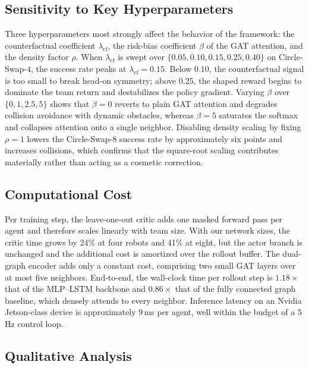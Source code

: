 \documentclass[journal,twoside,web]{ieeecolor}
\begin{document}
\subsection{Sensitivity to Key Hyperparameters}

Three hyperparameters most strongly affect the behavior of the framework: the counterfactual coefficient $\lambda_{\text{cf}}$, the risk-bias coefficient $\beta$ of the GAT attention, and the density factor $\rho$. When $\lambda_{\text{cf}}$ is swept over $\{0.05, 0.10, 0.15, 0.25, 0.40\}$ on Circle-Swap-$4$, the success rate peaks at $\lambda_{\text{cf}}=0.15$. Below $0.10$, the counterfactual signal is too small to break head-on symmetry; above $0.25$, the shaped reward begins to dominate the team return and destabilizes the policy gradient. Varying $\beta$ over $\{0, 1, 2.5, 5\}$ shows that $\beta=0$ reverts to plain GAT attention and degrades collision avoidance with dynamic obstacles, whereas $\beta=5$ saturates the softmax and collapses attention onto a single neighbor. Disabling density scaling by fixing $\rho=1$ lowers the Circle-Swap-$8$ success rate by approximately six points and increases collisions, which confirms that the square-root scaling contributes materially rather than acting as a cosmetic correction.

\subsection{Computational Cost}

Per training step, the leave-one-out critic adds one masked forward pass per agent and therefore scales linearly with team size. With our network sizes, the critic time grows by 24\% at four robots and 41\% at eight, but the actor branch is unchanged and the additional cost is amortized over the rollout buffer. The dual-graph encoder adds only a constant cost, comprising two small GAT layers over at most five neighbors. End-to-end, the wall-clock time per rollout step is $1.18\times$ that of the MLP--LSTM backbone and $0.86\times$ that of the fully connected graph baseline, which densely attends to every neighbor. Inference latency on an Nvidia Jetson-class device is approximately $9$\,ms per agent, well within the budget of a $5$\,Hz control loop.

\subsection{Qualitative Analysis}
\end{document}
